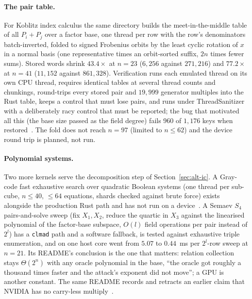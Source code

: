 \paragraph{The pair table.} For Koblitz index calculus the same
directory builds the meet-in-the-middle table of all $P_i+P_j$ over a
factor base, one thread per row with the row's denominators
batch-inverted, folded to signed Frobenius orbits by the least cyclic
rotation of $x$ in a normal basis (one representative times an
orbit-sorted suffix, $2n$ times fewer sums). Stored words shrink
$43.4\times$ at $n=23$ ($6{,}256$ against $271{,}216$) and $77.2\times$ at
$n=41$ ($11{,}152$ against $861{,}328$). Verification runs each emulated
thread on its own CPU thread, requires identical tables at several
thread counts and chunkings, round-trips every stored pair and
$19{,}999$ generator multiples into the Rust table, keeps a control
that must lose pairs, and runs under ThreadSanitizer with a
deliberately racy control that must be reported; the bug that
motivated all this (the base size passed as the field degree) fails
960 of $1{,}176$ keys when restored~.
The fold does not reach $n=97$ (limited to $n\le62$) and the device
round trip is planned, not run.

\paragraph{Polynomial systems.} Two more kernels serve the
decomposition step of Section~\ref{sec:alt-ic}. A Gray-code fast
exhaustive search over quadratic Boolean systems (one thread per
sub-cube, $n\le40$, $\le64$ equations, shards checked against brute
force) exists alongside the production Rust path and has not run on a
device~. A Semaev $S_4$ pairs-and-solve sweep
(fix $X_1,X_2$, reduce the quartic in $X_3$ against the linearised
polynomial of the factor-base subspace, $O(l)$ field operations per
pair instead of $2^l$) has a \texttt{clmad} path and a software
fallback, is tested against exhaustive triple enumeration, and on
one host core went from $5.07$ to $0.44$~ms per $2^l$-row sweep at
$n=21$. Its README's conclusion is the one that matters: relation
collection stays $\Theta(2^n)$ with any oracle polynomial in the base,
``the oracle got roughly a thousand times faster and the attack's
exponent did not move''; a GPU is another constant. The same README
records and retracts an earlier claim that NVIDIA has no carry-less
multiply~.


